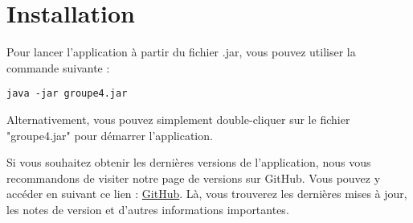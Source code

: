 \section{Installation}

Pour lancer l'application à partir du fichier .jar, vous pouvez utiliser la commande suivante :

\begin{verbatim}
java -jar groupe4.jar
\end{verbatim}

Alternativement, vous pouvez simplement double-cliquer sur le fichier "groupe4.jar" pour démarrer l'application.

Si vous souhaitez obtenir les dernières versions de l'application, nous vous recommandons de visiter notre page de versions sur GitHub. Vous pouvez y accéder en suivant ce lien : \href{https://github.com/Gr4-M3ACNL/hashi}{GitHub}. Là, vous trouverez les dernières mises à jour, les notes de version et d'autres informations importantes.